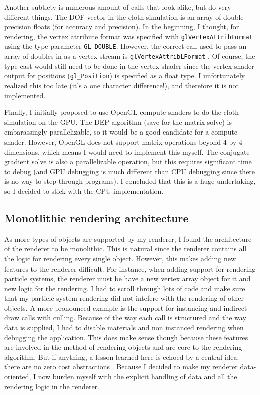 \documentclass[letterpaper, 10 pt, conference]{ieeeconf}  %
\begin{document}
Another subtlety is numerous amount of calls that look-alike, but do very different things. The DOF vector in the cloth simulation is an array of double precision floats (for accuracy and precision). In the beginning, I thought, for rendering, the vertex attribute format was specified with \texttt{glVertexAttribFormat} using the type parameter \texttt{GL\_DOUBLE}. However, the correct call used to pass an array of doubles in as a vertex stream is \texttt{glVertexAttrib\textbf{L}Format} \cite{opengl_documentation}. Of course, the type cast would still need to be done in the vertex shader since the vertex shader output for positions (\texttt{gl\_Position}) is specified as a float type. I unfortunately realized this too late (it's a one character difference!), and therefore it is not implemented. 

Finally, I initially proposed to use OpenGL compute shaders to do the cloth simulation on the GPU. The DEP algorithm (save for the matrix solve) is embarassingly parallelizable, so it would be a good candidate for a compute shader. However, OpenGL does not support matrix operations beyond 4 by 4 dimensions, which means I would need to implement this myself. The conjugate gradient solve \cite{bolz2003sparse} is also a parallelizable operation, but this requires significant time to debug (and GPU debugging is much different than CPU debugging since there is no way to step through programs). I concluded that this is a huge undertaking, so I decided to stick with the CPU implementation.

\subsection{Monotlithic rendering architecture}
As more types of objects are supported by my renderer, I found the architecture of the renderer to be monolithic. This is natural since the renderer contains all the logic for rendering every single object. However, this makes adding new features to the renderer difficult. For instance, when adding support for rendering particle systems, the renderer must be have a new vertex array object for it and new logic for the rendering. I had to scroll through lots of code and make sure that my particle system rendering did not intefere with the rendering of other objects. A more pronounced example is the support for instancing and indirect draw calls with culling. Because of the way each call is structured and the way data is supplied, I had to disable materials and non instanced rendering when debugging the application. This does make sense though because these features are involved in the method of rendering objects and are core to the rendering algorithm. But if anything, a lesson learned here is echoed by a central idea: there are no zero cost abstractions \cite{caruth2019}. Because I decided to make my renderer data-oriented, I now burden myself with the explicit handling of data and all the rendering logic in the renderer. 
\end{document}
